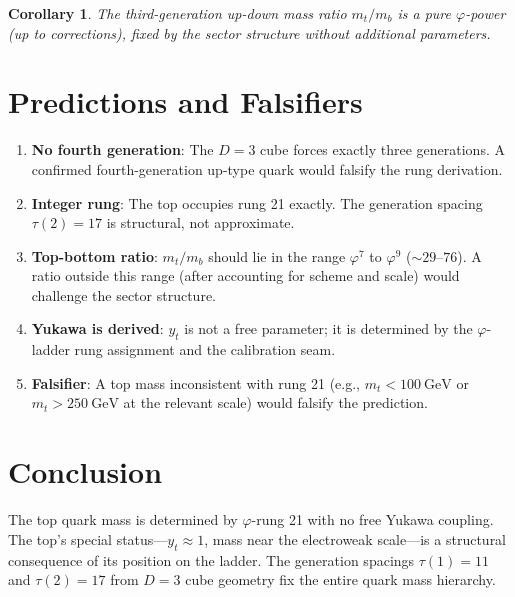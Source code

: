 \documentclass[12pt,a4paper]{article}
\newtheorem{corollary}[theorem]{Corollary}
\theoremstyle{definition}
\theoremstyle{remark}
\begin{document}
\begin{corollary}
The third-generation up-down mass ratio $m_t/m_b$ is a pure
$\varphi$-power (up to corrections), fixed by the sector structure
without additional parameters.
\end{corollary}

\section{Predictions and Falsifiers}
\label{sec:predictions}

\begin{enumerate}
  \item \textbf{No fourth generation}: The $D = 3$ cube forces
  exactly three generations.  A confirmed fourth-generation up-type
  quark would falsify the rung derivation.

  \item \textbf{Integer rung}: The top occupies rung 21 exactly.
  The generation spacing $\tau(2) = 17$ is structural, not
  approximate.

  \item \textbf{Top-bottom ratio}: $m_t/m_b$ should lie in the range
  $\varphi^7$ to $\varphi^9$ ($\sim 29$--$76$).  A ratio outside this
  range (after accounting for scheme and scale) would challenge the
  sector structure.

  \item \textbf{Yukawa is derived}: $y_t$ is not a free parameter;
  it is determined by the $\varphi$-ladder rung assignment and the
  calibration seam.

  \item \textbf{Falsifier}: A top mass inconsistent with rung 21
  (e.g., $m_t < 100~\mathrm{GeV}$ or $m_t > 250~\mathrm{GeV}$ at
  the relevant scale) would falsify the prediction.
\end{enumerate}

\section{Conclusion}
\label{sec:conclusion}

The top quark mass is determined by $\varphi$-rung 21 with no free
Yukawa coupling.  The top's special status---$y_t \approx 1$, mass
near the electroweak scale---is a structural consequence of its
position on the ladder.  The generation spacings $\tau(1) = 11$ and
$\tau(2) = 17$ from $D = 3$ cube geometry fix the entire quark mass
hierarchy.
\end{document}
